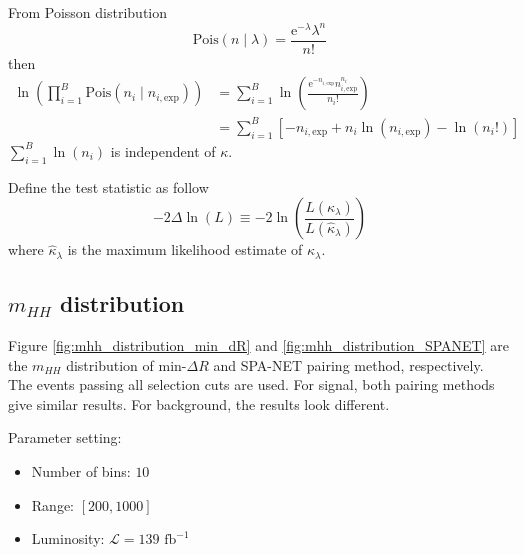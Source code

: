 \documentclass[12pt]{article}
\newcommand*{\euler}{\mathrm{e}}
\begin{document}
	From Poisson distribution
	\begin{equation}
		\text{Pois}(n\mid \lambda) = \frac{\euler^{-\lambda} \lambda^{n}}{n!} 
	\end{equation}
	then
	\begin{equation}
		\begin{aligned}
			\ln \left( \prod_{i=1}^{B} \text{Pois}(n_i\mid n_{i,\text{exp}}) \right) &=  \sum_{i=1}^{B} \ln \left( \frac{\euler^{-n_{i,\text{exp}}} n_{i,\text{exp}}^{n_i}}{n_i!} \right) \\
			&=  \sum_{i=1}^{B} \left[ - n_{i,\text{exp}} + n_i \ln (n_{i,\text{exp}} ) - \ln (n_i!)\right]
		\end{aligned}
	\end{equation}
	$\sum_{i=1}^{B} \ln(n_i)$ is independent of $\kappa$.

	Define the test statistic as follow
	\begin{equation}
		-2 \Delta \ln (L) \equiv -2 \ln \left( \frac{L (\kappa_\lambda)}{L(\hat{\kappa}_\lambda)} \right)
	\end{equation}
	where $\hat{\kappa}_\lambda$ is the maximum likelihood estimate of $\kappa_\lambda$.

	\subsection{\texorpdfstring{$m_{HH}$}{mhh} distribution}%
	\label{sub:mhh_distribution}
		Figure \ref{fig:mhh_distribution_min_dR} and \ref{fig:mhh_distribution_SPANET} are the $m_{HH}$ distribution of $\text{min-}\Delta R$ and SPA-NET pairing method, respectively. The events passing all selection cuts are used. For signal, both pairing methods give similar results. For background, the results look different.

		Parameter setting:
		\begin{itemize}
			\item Number of bins: $10$
			\item Range: $[200,1000]$
			\item Luminosity: $\mathcal{L} = 139 \text{ fb}^{-1}$
		\end{itemize}
\end{document}
